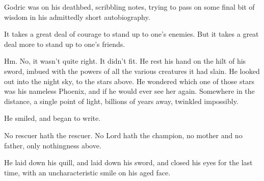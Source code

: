 Godric was on his deathbed, scribbling notes, trying to pass on some final bit of wisdom in his admittedly short autobiography.

It takes a great deal of courage to stand up to one’s enemies. But it takes a great deal more to stand up to one’s friends.

Hm. No, it wasn’t quite right. It didn’t fit. He rest his hand on the hilt of his sword, imbued with the powers of all the various creatures it had slain. He looked out into the night sky, to the stars above. He wondered which one of those stars was his nameless Phoenix, and if he would ever see her again. Somewhere in the distance, a single point of light, billions of years away, twinkled impossibly.

He smiled, and began to write.

No rescuer hath the rescuer.
No Lord hath the champion,
no mother and no father,
only nothingness above.

He laid down his quill, and laid down his sword, and closed his eyes for the last time, with an uncharacteristic smile on his aged face.